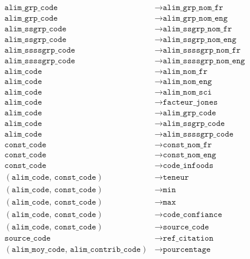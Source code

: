 \documentclass[12pt, a4paper]{article}
\newcommand{\attr}[1]{\texttt{#1}}
\begin{document}
    \begin{align*}
        \attr{alim\_grp\_code}     &\rightarrow \attr{alim\_grp\_nom\_fr} \\
        \attr{alim\_grp\_code}     &\rightarrow \attr{alim\_grp\_nom\_eng} \\
        \attr{alim\_ssgrp\_code}   &\rightarrow \attr{alim\_ssgrp\_nom\_fr} \\
        \attr{alim\_ssgrp\_code}   &\rightarrow \attr{alim\_ssgrp\_nom\_eng} \\
        \attr{alim\_ssssgrp\_code} &\rightarrow \attr{alim\_ssssgrp\_nom\_fr} \\
        \attr{alim\_ssssgrp\_code} &\rightarrow \attr{alim\_ssssgrp\_nom\_eng} \\
        \attr{alim\_code}          &\rightarrow \attr{alim\_nom\_fr} \\
        \attr{alim\_code}          &\rightarrow \attr{alim\_nom\_eng} \\
        \attr{alim\_code}          &\rightarrow \attr{alim\_nom\_sci} \\
        \attr{alim\_code}          &\rightarrow \attr{facteur\_jones} \\
        \attr{alim\_code}          &\rightarrow \attr{alim\_grp\_code} \\
        \attr{alim\_code}          &\rightarrow \attr{alim\_ssgrp\_code} \\
        \attr{alim\_code}          &\rightarrow \attr{alim\_ssssgrp\_code} \\
        \attr{const\_code}         &\rightarrow \attr{const\_nom\_fr} \\
        \attr{const\_code}         &\rightarrow \attr{const\_nom\_eng} \\
        \attr{const\_code}         &\rightarrow \attr{code\_infoods} \\
        (\attr{alim\_code},\,\attr{const\_code}) &\rightarrow \attr{teneur} \\
        (\attr{alim\_code},\,\attr{const\_code}) &\rightarrow \attr{min} \\
        (\attr{alim\_code},\,\attr{const\_code}) &\rightarrow \attr{max} \\
        (\attr{alim\_code},\,\attr{const\_code}) &\rightarrow \attr{code\_confiance} \\
        (\attr{alim\_code},\,\attr{const\_code}) &\rightarrow \attr{source\_code} \\
        \attr{source\_code}        &\rightarrow \attr{ref\_citation} \\
        (\attr{alim\_moy\_code},\,\attr{alim\_contrib\_code}) &\rightarrow \attr{pourcentage}
    \end{align*}
\end{document}
